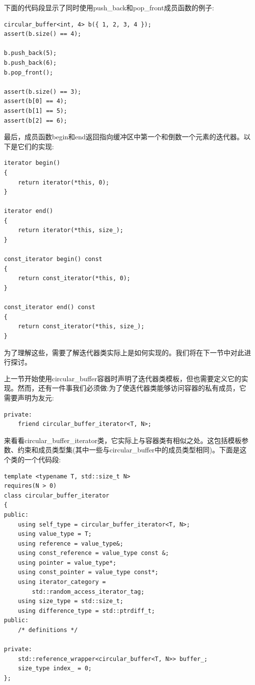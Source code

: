下面的代码段显示了同时使用push\_back和pop\_front成员函数的例子:

\begin{lstlisting}[style=styleCXX]
circular_buffer<int, 4> b({ 1, 2, 3, 4 });
assert(b.size() == 4);

b.push_back(5);
b.push_back(6);
b.pop_front();

assert(b.size() == 3);
assert(b[0] == 4);
assert(b[1] == 5);
assert(b[2] == 6);
\end{lstlisting}

最后，成员函数begin和end返回指向缓冲区中第一个和倒数一个元素的迭代器。以下是它们的实现:

\begin{lstlisting}[style=styleCXX]
iterator begin()
{
	return iterator(*this, 0);
}

iterator end()
{
	return iterator(*this, size_);
}

const_iterator begin() const
{
	return const_iterator(*this, 0);
}

const_iterator end() const
{
	return const_iterator(*this, size_);
}
\end{lstlisting}

为了理解这些，需要了解迭代器类实际上是如何实现的。我们将在下一节中对此进行探讨。


上一节开始使用circular\_buffer容器时声明了迭代器类模板，但也需要定义它的实现。然而，还有一件事我们必须做:为了使迭代器类能够访问容器的私有成员，它需要声明为友元:

\begin{lstlisting}[style=styleCXX]
private:
	friend circular_buffer_iterator<T, N>;
\end{lstlisting}

来看看circular\_buffer\_iterator类，它实际上与容器类有相似之处。这包括模板参数、约束和成员类型集(其中一些与circular\_buffer中的成员类型相同)。下面是这个类的一个代码段:

\begin{lstlisting}[style=styleCXX]
template <typename T, std::size_t N>
requires(N > 0)
class circular_buffer_iterator
{
public:
	using self_type = circular_buffer_iterator<T, N>;
	using value_type = T;
	using reference = value_type&;
	using const_reference = value_type const &;
	using pointer = value_type*;
	using const_pointer = value_type const*;
	using iterator_category =
		std::random_access_iterator_tag;
	using size_type = std::size_t;
	using difference_type = std::ptrdiff_t;
public:
	/* definitions */
	
private:
	std::reference_wrapper<circular_buffer<T, N>> buffer_;
	size_type index_ = 0;
};
\end{lstlisting}

